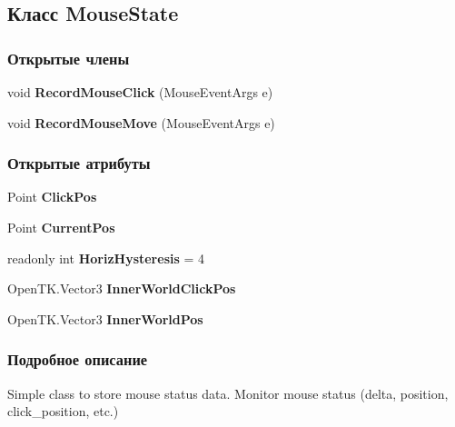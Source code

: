 \subsection{Класс Mouse\+State}
\label{class_win_form_animation2_d_1_1_mouse_state}
\subsubsection*{Открытые члены}
\begin{DoxyCompactItemize}
\item 
void {\bf Record\+Mouse\+Click} (Mouse\+Event\+Args e)\label{class_win_form_animation2_d_1_1_mouse_state_a90501009d4cbf911a31d880523548f63}

\item 
void {\bf Record\+Mouse\+Move} (Mouse\+Event\+Args e)\label{class_win_form_animation2_d_1_1_mouse_state_afa4a1b4f3fc39ff61fd13d7ba3e5d628}

\end{DoxyCompactItemize}
\subsubsection*{Открытые атрибуты}
\begin{DoxyCompactItemize}
\item 
Point {\bf Click\+Pos}\label{class_win_form_animation2_d_1_1_mouse_state_aff1227a0577100876a98c04ad407d9f4}

\item 
Point {\bf Current\+Pos}\label{class_win_form_animation2_d_1_1_mouse_state_aa03fd24e8bc7ea3e7ed22a9c564cb650}

\item 
readonly int {\bf Horiz\+Hysteresis} = 4\label{class_win_form_animation2_d_1_1_mouse_state_a2564dfd90e7599c1f850ecc35b4243ea}

\item 
Open\+T\+K.\+Vector3 {\bf Inner\+World\+Click\+Pos}\label{class_win_form_animation2_d_1_1_mouse_state_a2ba32d9d742f09b887d7487ead69490c}

\item 
Open\+T\+K.\+Vector3 {\bf Inner\+World\+Pos}\label{class_win_form_animation2_d_1_1_mouse_state_ae4a531cfd584f7535a84d3491c0d233a}

\end{DoxyCompactItemize}


\subsubsection{Подробное описание}
Simple class to store mouse status data. Monitor mouse status (delta, position, click\+\_\+position, etc.) 

